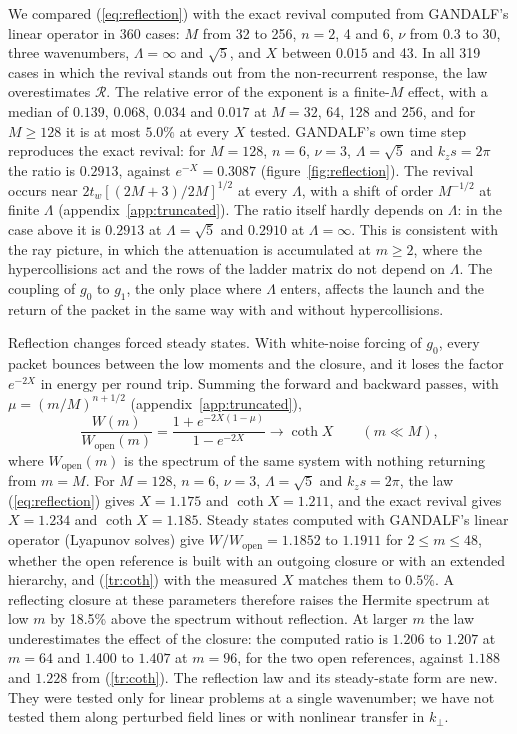 We compared (\ref{eq:reflection}) with the exact revival computed from GANDALF's linear operator in 360 cases: $M$ from 32 to 256, $n=2$, 4 and 6, $\nu$ from $0.3$ to 30, three wavenumbers, $\Lambda=\infty$ and $\sqrt5$, and $X$ between $0.015$ and 43. In all 319 cases in which the revival stands out from the non-recurrent response, the law overestimates $\mathcal R$. The relative error of the exponent is a finite-$M$ effect, with a median of $0.139$, $0.068$, $0.034$ and $0.017$ at $M=32$, 64, 128 and 256, and for $M\ge128$ it is at most $5.0\%$ at every $X$ tested. GANDALF's own time step reproduces the exact revival: for $M=128$, $n=6$, $\nu=3$, $\Lambda=\sqrt5$ and $k_zs=2\pi$ the ratio is $0.2913$, against $e^{-X}=0.3087$ (figure~\ref{fig:reflection}). The revival occurs near $2t_w[(2M+3)/2M]^{1/2}$ at every $\Lambda$, with a shift of order $M^{-1/2}$ at finite $\Lambda$ (appendix~\ref{app:truncated}). The ratio itself hardly depends on $\Lambda$: in the case above it is $0.2913$ at $\Lambda=\sqrt5$ and $0.2910$ at $\Lambda=\infty$. This is consistent with the ray picture, in which the attenuation is accumulated at $m\ge2$, where the hypercollisions act and the rows of the ladder matrix do not depend on $\Lambda$. The coupling of $g_0$ to $g_1$, the only place where $\Lambda$ enters, affects the launch and the return of the packet in the same way with and without hypercollisions.

Reflection changes forced steady states. With white-noise forcing of $g_0$, every packet bounces between the low moments and the closure, and it loses the factor $e^{-2X}$ in energy per round trip. Summing the forward and backward passes, with $\mu=(m/M)^{n+1/2}$ (appendix~\ref{app:truncated}),
\begin{equation}\label{tr:coth}
  \frac{W(m)}{W_{\mathrm{open}}(m)}=\frac{1+e^{-2X(1-\mu)}}{1-e^{-2X}}\to\coth X\qquad(m\ll M),
\end{equation}
where $W_{\mathrm{open}}(m)$ is the spectrum of the same system with nothing returning from $m=M$. For $M=128$, $n=6$, $\nu=3$, $\Lambda=\sqrt5$ and $k_zs=2\pi$, the law (\ref{eq:reflection}) gives $X=1.175$ and $\coth X=1.211$, and the exact revival gives $X=1.234$ and $\coth X=1.185$. Steady states computed with GANDALF's linear operator (Lyapunov solves) give $W/W_{\mathrm{open}}=1.1852$ to $1.1911$ for $2\le m\le48$, whether the open reference is built with an outgoing closure or with an extended hierarchy, and (\ref{tr:coth}) with the measured $X$ matches them to $0.5\%$. A reflecting closure at these parameters therefore raises the Hermite spectrum at low $m$ by 18.5\% above the spectrum without reflection. At larger $m$ the law underestimates the effect of the closure: the computed ratio is $1.206$ to $1.207$ at $m=64$ and $1.400$ to $1.407$ at $m=96$, for the two open references, against $1.188$ and $1.228$ from (\ref{tr:coth}). The reflection law and its steady-state form are new. They were tested only for linear problems at a single wavenumber; we have not tested them along perturbed field lines or with nonlinear transfer in $k_\perp$.


